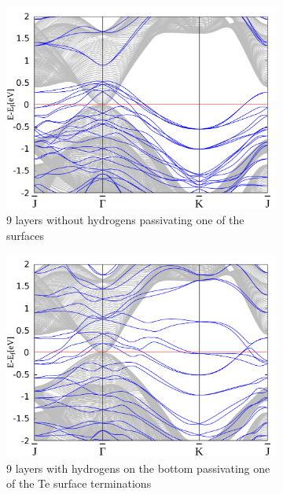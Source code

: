 \begin{figure}[htbp]
\begin{subfigure}[c]{.48\linewidth}
			\centering
			\includegraphics[width=\linewidth]{Te_termination/no_H_bulk+9_layers_no_dos_-2_2.pdf}
			\caption{9 layers without hydrogens passivating one of the surfaces}
		\end{subfigure}
		\hfill
		\begin{subfigure}[c]{.48\linewidth}
			\centering
			\includegraphics[width=\linewidth]{Te_termination/bulk+9_layers_no_dos_-2_2.pdf}
			\caption{9 layers with hydrogens on the bottom passivating one of the Te surface terminations}
		\end{subfigure}
		\begin{subfigure}[c]{.48\linewidth}
			\centering 

\end{subfigure}
\end{figure}
